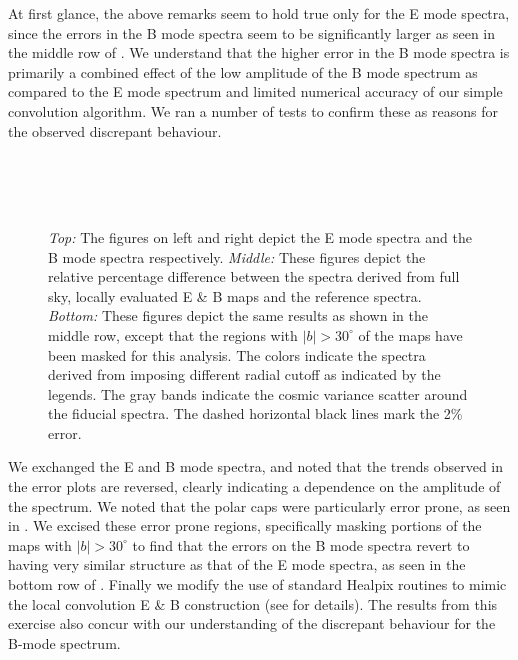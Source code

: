 At first glance, the above remarks seem to hold true only for the E mode spectra, since the errors in the B mode spectra seem to be significantly larger as seen in the middle row of . We understand that the higher error in the B mode spectra is primarily a combined effect of the low amplitude of the B mode spectrum as compared to the E mode spectrum and limited numerical accuracy of our simple convolution algorithm. We ran a number of tests to confirm these as reasons for the observed discrepant behaviour. 
%
\begin{figure}[!t] 
\centering
\\[-6ex]
\\[-6ex]
 \\[-2ex]
\caption{\textit{Top:} The figures on left and right depict the E mode spectra and the B mode spectra respectively. \textit{Middle:} These figures depict the relative percentage difference between the spectra derived from full sky, locally evaluated E \& B  maps and the reference spectra. \textit{Bottom:} These figures depict the same results as shown in the middle row, except that the regions with $|b|>30^\circ$ of the maps have been masked for this analysis. 
The colors indicate the spectra derived from imposing different radial cutoff as indicated by the legends. The gray bands indicate the cosmic variance scatter around the fiducial spectra. The dashed horizontal black lines mark the 2\% error.}
\label{fig:eb-spectra_rad_cutoff}
\end{figure}
%
We exchanged the E and B mode spectra,  and noted that the trends observed in the error plots are reversed, clearly indicating a dependence on the amplitude of the spectrum. We noted that the polar caps were particularly error prone, as seen in . We excised these error prone regions, specifically masking portions of the maps with $|b|>30^{\circ}$ to find that the errors on the B mode spectra revert to having very similar structure as that of the E mode spectra, as seen in the bottom row of . Finally we modify the use of standard Healpix routines to mimic the local convolution E \& B construction (see  for details). The results from this exercise also concur with our understanding of the discrepant behaviour for the B-mode spectrum.
